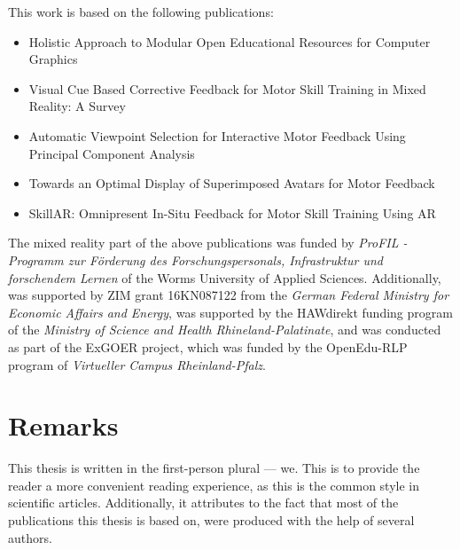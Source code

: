 This work is based on the following publications:
\begin{itemize}
	\setlength{\itemsep}{-0.3cm}
	\item Holistic Approach to Modular Open Educational Resources for Computer Graphics \cite{diller2024holistic}
	\item Visual Cue Based Corrective Feedback for Motor Skill Training in Mixed Reality: A Survey \cite{diller2022vcb}
	\item Automatic Viewpoint Selection for Interactive Motor Feedback Using Principal Component Analysis \cite{diller2024automatic}
	\item Towards an Optimal Display of Superimposed Avatars for Motor Feedback \cite{diller2025towards}
	\item SkillAR: Omnipresent In-Situ Feedback for Motor Skill Training Using AR \cite{diller2025skillar}
\end{itemize}


The mixed reality part of the above publications was funded by \emph{ProFIL - Programm zur Förderung des Forschungspersonals, Infrastruktur und forschendem Lernen} of the Worms University of Applied Sciences. Additionally, \cite{diller2024automatic} was supported by ZIM grant 16KN087122 from the \emph{German Federal Ministry for Economic Affairs and Energy}, \cite{diller2025skillar} was supported by the HAWdirekt funding program of the \emph{Ministry of Science and Health Rhineland-Palatinate}, and \cite{diller2024holistic} was conducted as part of the ExGOER project, which was funded by the OpenEdu-RLP program of \emph{Virtueller Campus Rheinland-Pfalz}.

\section{Remarks}

This thesis is written in the first-person plural --- we. This is to provide the reader a more convenient reading experience, as this is the common style in scientific articles. Additionally, it attributes to the fact that most of the publications this thesis is based on, were produced with the help of several authors.